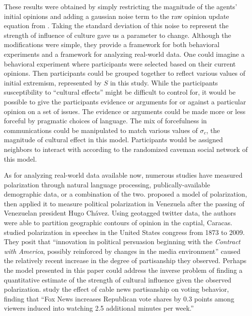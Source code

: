 \documentclass[11pt,letterpaper]{article}
\newcommand{\sigc}{\ensuremath{\sigma_c}}
\begin{document}
These results were obtained by simply restricting the magnitude of the 
agents' initial opinions and adding a gaussian noise term to the raw opinion update
equation from . Taking the standard deviation of this noise
to represent the strength of influence of culture gave us a parameter to 
change. Although the modifications were simple, they provide a framework for
both behavioral experiments and a framework for analyzing real-world data.
One could imagine a behavioral experiment where participants were selected based
on their current opinions. Then participants could be grouped together to 
reflect various values of initial extremism, represented by $S$ in this study.
While the participants susceptibility to ``cultural effects'' might be difficult
to control for, it would be possible to give the participants evidence or 
arguments for or against a particular opinion on a set of issues. The evidence
or arguments could be made more or less forceful by pragmatic choices of 
language. The mix of forcefulness in communications could be manipulated to 
match various values of $\sigc$, the magnitude of cultural effect in this model.
Participants would be assigned neighbors to interact with according to the 
randomized caveman social network of this model.

As for analyzing real-world data available now, numerous studies have measured
polarization through natural language processing, publically-available 
demographic data, or a combination of the two.  proposed
a model of polarization, then applied it to measure political polarization 
in Venezuela after the passing of Venezuelan president Hugo Chávez. Using 
geotagged twitter data, the authors were able to partition geographic contours
of opinion in the captial, Caracas.  studied polarization
in speeches in the United States congress from 1873 to 2009. They posit that
``innovation in political persuasion beginning with the \textit{Contract with
America}, possibly reinforced by changes in the media environment'' caused
the relatively recent increase in the degree of partisanship they observed. 
Perhaps the model presented in this paper could address the inverse problem of
finding a quantitative estimate of the strength of cultural influence given
the observed polarization.  study the effect of cable news
partisanship on voting behavior, finding that ``Fox News increases Republican
vote shares by 0.3 points among viewers induced into watching 2.5 additional
minutes per week.'' 
\end{document}

